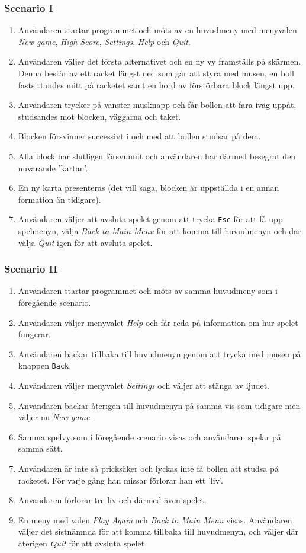 \documentclass[11pt,a4paper]{article}
\begin{document}
\subsubsection{Scenario I}
\begin{enumerate}
	\item Användaren startar programmet och möts av en huvudmeny med menyvalen \emph{New game}, \emph{High Score}, \emph{Settings}, \emph{Help} och \emph{Quit}.
	\item Användaren väljer det första alternativet och en ny vy framställs på skärmen. Denna består av ett racket längst ned som går att styra med musen, en boll fastsittandes mitt på racketet samt en hord av förstörbara block längst upp.
	\item Användaren trycker på vänster musknapp och får bollen att fara iväg uppåt, studsandes mot blocken, väggarna och taket.
	\item Blocken försvinner successivt i och med att bollen studsar på dem.
	\item Alla block har slutligen försvunnit och användaren har därmed besegrat den nuvarande 'kartan'.
	\item En ny karta presenteras (det vill säga, blocken är uppställda i en annan formation än tidigare).
	\item Användaren väljer att avsluta spelet genom att trycka \texttt{Esc} för att få upp spelmenyn, välja \emph{Back to Main Menu} för att komma till huvudmenyn och där välja \emph{Quit} igen för att avsluta spelet.
\end{enumerate}

\subsubsection{Scenario II}
\begin{enumerate}
	\item Användaren startar programmet och möts av samma huvudmeny som i föregående scenario.
	\item Användaren väljer menyvalet \emph{Help} och får reda på information om hur spelet fungerar.
	\item Användaren backar tillbaka till huvudmenyn genom att trycka med musen på knappen \texttt{Back}.
	\item Användaren väljer menyvalet \emph{Settings} och väljer att stänga av ljudet.
	\item Användaren backar återigen till huvudmenyn på samma vis som tidigare men väljer nu \emph{New game}.
	\item Samma spelvy som i föregående scenario visas och användaren spelar på samma sätt.
	\item Användaren är inte så pricksäker och lyckas inte få bollen att studsa på racketet. För varje gång han missar förlorar han ett 'liv'.
	\item Användaren förlorar tre liv och därmed även spelet.
	\item En meny med valen \emph{Play Again} och \emph{Back to Main Menu} visas. Användaren väljer det sistnämnda för att komma tillbaka till huvudmenyn, och väljer där återigen \emph{Quit} för att avsluta spelet.
\end{enumerate}
\end{document}
